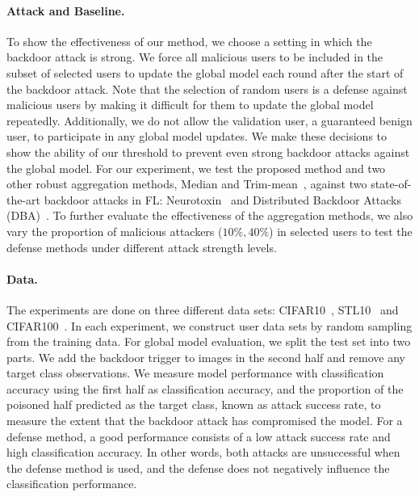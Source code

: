 \documentclass{article} %
\begin{document}
\paragraph{Attack and Baseline.} To show the effectiveness of our method, we choose a setting in which the backdoor attack is strong. We force all malicious users to be included in the subset of selected users to update the global model each round after the start of the backdoor attack. Note that the selection of random users is a defense against malicious users by making it difficult for them to update the global model repeatedly. Additionally, we do not allow the validation user, a guaranteed benign user, to participate in any global model updates. We make these decisions to show the ability of our threshold to prevent even strong backdoor attacks against the global model. 
For our experiment, we test the proposed method and two other robust aggregation methods, Median and Trim-mean~\citep{trim-mean}, against two state-of-the-art backdoor attacks in FL: Neurotoxin~\citep{neurotoxin} and Distributed Backdoor Attacks (DBA)~\citep{dba}. To further evaluate the effectiveness of the aggregation methods, we also vary the proportion of malicious attackers ($10\%, 40\%$) in selected users to test the defense methods under different attack strength levels.

\paragraph{Data.} The experiments are done on three different data sets: CIFAR10~\citep{krizhevsky2009learning}, STL10~\citep{coates2011analysis} and CIFAR100~\citep{krizhevsky2009learning}. In each experiment, we construct user data sets by random sampling from the training data. For global model evaluation, we split the test set into two parts. We add the backdoor trigger to images in the second half and remove any target class observations. We measure model performance with classification accuracy using the first half as {\color{blue}classification accuracy}, and the proportion of the poisoned half predicted as the target class, known as {\color{red}attack success rate}, to measure the extent that the backdoor attack has compromised the model. 
For a defense method, a good performance consists of a low attack success rate and high classification accuracy. In other words, both attacks are unsuccessful when the defense method is used, and the defense does not negatively influence the classification performance. 
\end{document}
